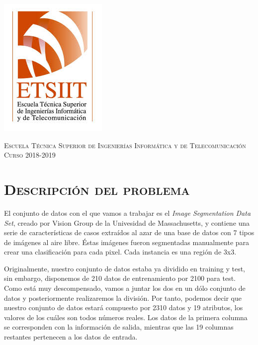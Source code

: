 \documentclass[11pt,a4paper]{article}
\begin{document}
\begin{titlepage}
\begin{minipage}{\textwidth}
\includegraphics[scale=0.3]{img/etsiit.jpeg}

\vspace{0.7cm}
\textsc{Escuela Técnica Superior de Ingenierías Informática y de Telecomunicación}\\
\vspace{1cm}
\textsc{Curso 2018-2019}
\end{minipage}
\end{titlepage}

\tableofcontents
\thispagestyle{empty}				%


\newpage

\setlength{\parskip}{1em}

\section{\textsc{Descripción del problema}}

El conjunto de datos con el que vamos a trabajar es el \textit{Image Segmentation Data Set}, creado por Vision Group de la Univesidad de Massachusetts, y contiene una serie de características de casos extraídos al azar de una base de datos con 7 tipos de imágenes al aire libre. Éstas imágenes fueron segmentadas manualmente para crear una clasificación para cada pixel. Cada instancia es una región de 3x3.

Originalmente, nuestro conjunto de datos estaba ya dividido en training y test, sin embargo, disponemos de 210 datos de entrenamiento por 2100 para test. Como está muy descompensado, vamos a juntar los dos en un dólo conjunto de datos y posteriormente realizaremos la división. Por tanto, podemos decir que nuestro conjunto de datos estará compuesto por 2310 datos y 19 atributos, los valores de los cuáles son todos números reales. Los datos de la primera columna se corresponden con la información de salida, mientras que las 19  columnas restantes pertenecen a los datos de entrada.
\end{document}
